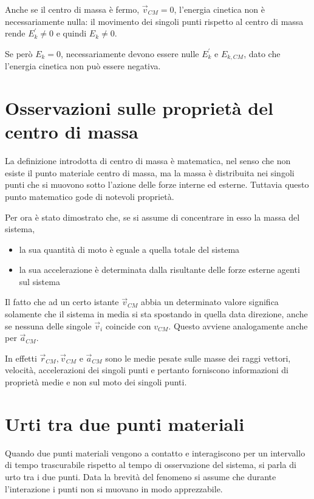 \documentclass[class=book, crop=false, oneside, 12pt]{standalone}
\begin{document}
Anche se il centro di massa è fermo, \(\overrightarrow{v}_{CM} = 0\), l'energia cinetica non è necessariamente nulla: il movimento dei singoli punti rispetto al centro di massa rende \(E_k^{\prime} \neq 0\) e quindi \(E_k \neq 0\).

Se però \(E_k = 0\), necessariamente devono essere nulle \(E_k^{\prime}\) e \(E_{k, CM}\), dato che l'energia cinetica non può essere negativa. 

\section{Osservazioni sulle proprietà del centro di massa}

La definizione introdotta di centro di massa è matematica, nel senso che non esiste il punto materiale centro di massa, ma la massa è distribuita nei singoli punti che si muovono sotto l'azione delle forze interne ed esterne. 
Tuttavia questo punto matematico gode di notevoli proprietà.

Per ora è stato dimostrato che, se si assume di concentrare in esso la massa del sistema, 
\begin{itemize}
    \item la sua quantità di moto è eguale a quella totale del sistema
    \item la sua accelerazione è determinata dalla risultante delle forze esterne agenti sul sistema
\end{itemize}

Il fatto che ad un certo istante \(\overrightarrow{v}_{CM}\) abbia un determinato valore significa solamente che il sistema in media si sta spostando in quella data direzione, anche se nessuna delle singole \(\overrightarrow{v}_i\) coincide con \(v_{CM}\).
Questo avviene analogamente anche per \(\overrightarrow{a}_{CM}\).

In effetti \(\overrightarrow{r}_{CM}, \overrightarrow{v}_{CM}\) e \(\overrightarrow{a}_{CM}\) sono le medie pesate sulle masse dei raggi vettori, velocità, accelerazioni dei singoli punti e pertanto forniscono informazioni di proprietà medie e non sul moto dei singoli punti. 

\section{Urti tra due punti materiali}

Quando due punti materiali vengono a contatto e interagiscono per un intervallo di tempo trascurabile rispetto al tempo di osservazione del sistema, si parla di urto tra i due punti.
Data la brevità del fenomeno si assume che durante l'interazione i punti non si muovano in modo apprezzabile.
\end{document}
